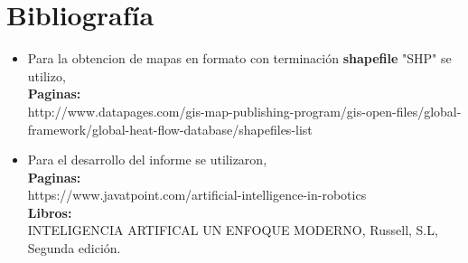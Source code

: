 \documentclass[a4paper]{article}
\begin{document}
\section{Bibliograf\'ia}
\begin{itemize}
\item Para la obtencion de mapas en formato con terminaci\'on \textbf{shapefile} "SHP" se utilizo,\\
\textbf{Paginas:}\\
http://www.datapages.com/gis-map-publishing-program/gis-open-files/global-framework/global-heat-flow-database/shapefiles-list
\item Para el desarrollo del informe se utilizaron,\\
\textbf{Paginas:}\\
https://www.javatpoint.com/artificial-intelligence-in-robotics\\ 
\textbf{Libros:}\\
INTELIGENCIA ARTIFICAL UN ENFOQUE MODERNO, Russell, S.L, Segunda edición.
\end{itemize}
\end{document}
